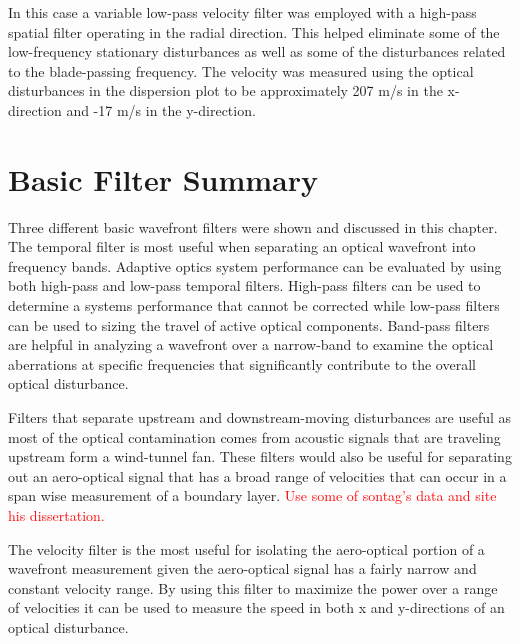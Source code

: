In this case a variable low-pass velocity filter was employed with a high-pass spatial filter operating in the radial direction.
This helped eliminate some of the low-frequency stationary disturbances as well as some of the disturbances related to the blade-passing frequency.
The velocity was measured using the optical disturbances in the dispersion plot to be approximately 207 m/s in the x-direction and -17 m/s in the y-direction.

\section{Basic Filter Summary}
Three different basic wavefront filters were shown and discussed in this chapter.
The temporal filter is most useful when separating an optical wavefront into frequency bands.
Adaptive optics system performance can be evaluated by using both high-pass and low-pass temporal filters.
High-pass filters can be used to determine a systems performance that cannot be corrected while low-pass filters can be used to sizing the travel of active optical components.
Band-pass filters are helpful in analyzing a wavefront over a narrow-band to examine the optical aberrations at specific frequencies that significantly contribute to the overall optical disturbance.

Filters that separate upstream and downstream-moving disturbances are useful as most of the optical contamination comes from acoustic signals that are traveling upstream form a wind-tunnel fan.
These filters would also be useful for separating out an aero-optical signal that has a broad range of velocities that can occur in a span wise measurement of a boundary layer.
\textcolor{red}{Use some of sontag's data and site his dissertation.}

The velocity filter is the most useful for isolating the aero-optical portion of a wavefront measurement given the aero-optical signal has a fairly narrow and constant velocity range.
By using this filter to maximize the power over a range of velocities it can be used to measure the speed in both x and y-directions of an optical disturbance.
